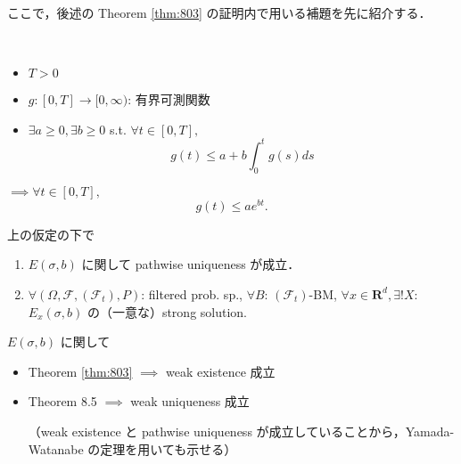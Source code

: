 \documentclass{jsarticle}
\begin{document}
ここで，後述の Theorem \ref{thm:803} の証明内で用いる補題を先に紹介する．

\setcounter{thm}{3}

\begin{screen}
    \begin{lem}\label{lem:804}~
        \begin{itemize}
            \item 
            $T>0$
            \item 
            $g:[0, T]\to[0, \infty)$: 有界可測関数
            \item 
            $\exists a\ge0, \exists b\ge0$ s.t. $\forall t\in[0, T], $
            $$
            g(t)\le a+b\int_0^t g(s)ds
            $$
        \end{itemize}
        $\implies \forall t\in[0, T], $
        $$
        g(t)\le ae^{bt}.
        $$
    \end{lem}
\end{screen}

\setcounter{thm}{2}

\begin{screen}
    \begin{thm}\label{thm:803}
        上の仮定の下で
        \begin{enumerate}[label=(\roman*)]
            \item
            $E(\sigma, b)$ に関して pathwise uniqueness が成立．
            \item
            $\forall (\Omega, \mathcal{F}, (\mathcal{F}_t), P)$: filtered prob. sp., $\forall B$: $(\mathcal{F}_t)$-BM, $\forall x\in\mathbf{R}^d, \exists! X$: $E_x(\sigma, b)$ の（一意な）strong solution.
        \end{enumerate}
    \end{thm}
\end{screen}

$E(\sigma, b)$ に関して 
\begin{itemize}
    \item 
    Theorem \ref{thm:803}
    $\implies $ weak existence 成立
    \item
    Theorem 8.5
    $\implies $ weak uniqueness 成立
    
    （weak existence と pathwise uniqueness が成立していることから，Yamada-Watanabe の定理を用いても示せる）
\end{itemize}
\end{document}
